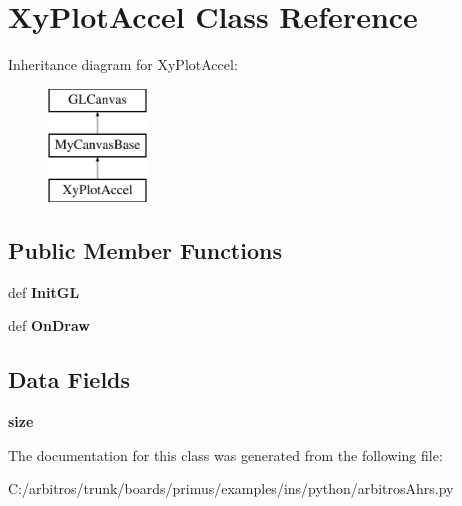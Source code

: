 \hypertarget{classarbitros_ahrs_1_1_xy_plot_accel}{\section{Xy\-Plot\-Accel Class Reference}
\label{classarbitros_ahrs_1_1_xy_plot_accel}
}
Inheritance diagram for Xy\-Plot\-Accel\-:\begin{figure}[H]
\begin{center}
\leavevmode
\includegraphics[height=3.000000cm]{classarbitros_ahrs_1_1_xy_plot_accel}
\end{center}
\end{figure}
\subsection*{Public Member Functions}
\begin{DoxyCompactItemize}
\item 
\hypertarget{classarbitros_ahrs_1_1_xy_plot_accel_aa5d4da6894799e330c531fcff2320723}{def {\bfseries Init\-G\-L}}\label{classarbitros_ahrs_1_1_xy_plot_accel_aa5d4da6894799e330c531fcff2320723}

\item 
\hypertarget{classarbitros_ahrs_1_1_xy_plot_accel_a06264628fa709c57ac53fe3f63080317}{def {\bfseries On\-Draw}}\label{classarbitros_ahrs_1_1_xy_plot_accel_a06264628fa709c57ac53fe3f63080317}

\end{DoxyCompactItemize}
\subsection*{Data Fields}
\begin{DoxyCompactItemize}
\item 
\hypertarget{classarbitros_ahrs_1_1_xy_plot_accel_aa3d6656320f1a7278c0c2c7fdf07617c}{{\bfseries size}}\label{classarbitros_ahrs_1_1_xy_plot_accel_aa3d6656320f1a7278c0c2c7fdf07617c}

\end{DoxyCompactItemize}


The documentation for this class was generated from the following file\-:\begin{DoxyCompactItemize}
\item 
C\-:/arbitros/trunk/boards/primus/examples/ins/python/arbitros\-Ahrs.\-py\end{DoxyCompactItemize}
